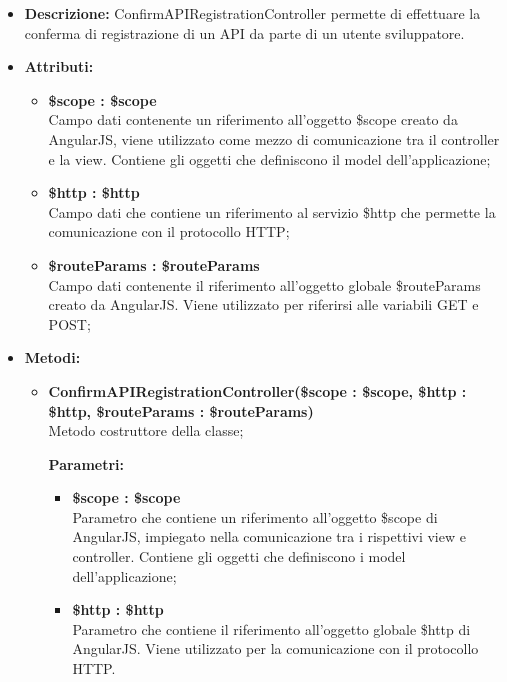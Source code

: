 \begin{itemize}
	\item \textbf{Descrizione:} ConfirmAPIRegistrationController permette di effettuare la conferma di registrazione di un API da parte di un utente sviluppatore.
	\item \textbf{Attributi:}
	\begin{itemize}
		
		\item \textbf{\$scope : \$scope}\\
		Campo dati contenente un riferimento all'oggetto \$scope creato da AngularJS, viene utilizzato come mezzo di comunicazione tra il controller e la view. Contiene gli oggetti che definiscono il model dell'applicazione;
		
		\item \textbf{\$http : \$http }\\
		Campo dati che contiene un riferimento al servizio \$http che permette la comunicazione con il protocollo HTTP;
		
		\item \textbf{\$routeParams : \$routeParams }\\
		Campo dati contenente il riferimento all'oggetto globale \$routeParams creato da AngularJS. Viene utilizzato per riferirsi alle variabili GET e POST;				
		
	\end{itemize}
	\item \textbf{Metodi:}
	\begin{itemize}
		
		\item \textbf{ConfirmAPIRegistrationController(\$scope : \$scope, \$http : \$http, \$routeParams : \$routeParams)}\\
		Metodo costruttore della classe;
		\begin{description}
			\item[\textbf{Parametri:}]
		\end{description}
		\begin{itemize}
			\item \textbf{\$scope : \$scope}\\
			Parametro che contiene un riferimento all'oggetto \$scope di AngularJS, impiegato nella comunicazione tra i rispettivi view e controller. Contiene gli oggetti che definiscono i model dell'applicazione;
			
			\item \textbf{\$http : \$http}\\
			Parametro che contiene il riferimento all'oggetto globale \$http di AngularJS. Viene utilizzato per la comunicazione con il protocollo HTTP.
			

\end{itemize}
\end{itemize}
\end{itemize}
